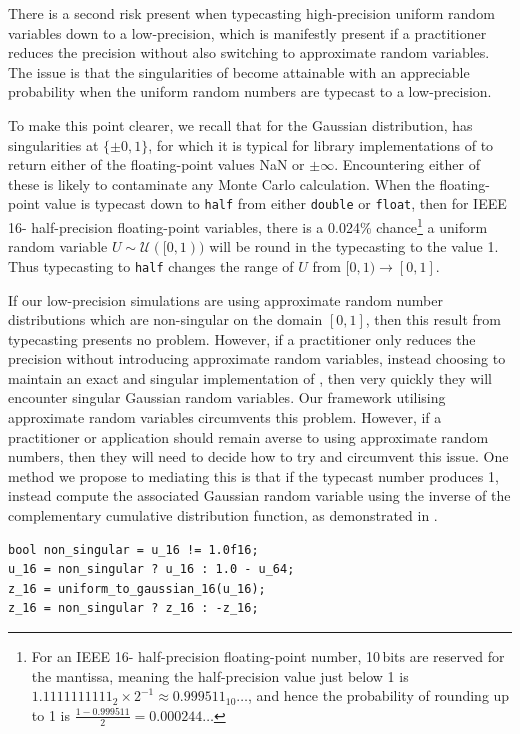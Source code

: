\documentclass[11pt,a4paper,twoside,english]{extarticle}
\begin{document}
There is a second risk present when typecasting high-precision uniform random variables down to a low-precision, which is manifestly present if a practitioner reduces the precision without also switching to approximate random variables. The issue is that the singularities of \PhiInverse become attainable with an appreciable probability when the uniform random numbers are typecast to a low-precision. 

To make this point clearer, we recall that for the Gaussian distribution, \PhiInverse has singularities at $ \{\pm 0, 1\} $, for which it is typical for library implementations of \PhiInverse to return either of the floating-point values NaN or $ \pm\infty $. Encountering either of these is likely to contaminate any Monte Carlo calculation. When the floating-point value is typecast down to \verb|half| from either \verb|double| or \verb|float|, then for IEEE 16-\si{\bit} half-precision floating-point variables, there is a 0.024\% chance\footnote{For an IEEE 16-\si{\bit} half-precision floating-point number, 10\,bits are reserved for the mantissa, meaning the half-precision value just below 1 is $ 1.1111111111_2\times2^{-1} \approx 0.999511_{10}\ldots $, and hence the probability of rounding up to 1 is  $ \tfrac{1 - 0.999511}{2} = 0.000244\ldots$} a uniform random variable $ U \sim \mathcal{U}([0,1)) $ will be round in the typecasting to the value 1. Thus typecasting to \verb|half| changes the range of $ U $ from $ [0, 1) \to [0, 1] $.

If our low-precision simulations are using approximate random number distributions which are non-singular on the domain $ [0, 1] $, then this result from typecasting presents no problem. However, if a practitioner only reduces the precision without introducing approximate random variables, instead choosing to maintain an exact and singular implementation of \PhiInverse, then very quickly they will encounter singular Gaussian random variables. Our framework utilising approximate random variables circumvents this problem. However, if a practitioner or application should remain averse to using approximate random numbers, then they will need to decide how to try and circumvent this issue. One method we propose to mediating this is that if the typecast number produces 1, instead compute the associated Gaussian random variable using the inverse of the complementary cumulative distribution function, as demonstrated in .


\begin{lstfloat}[htb]
\begin{lstlisting}[style=C, captionpos=b, caption={[Compute Gaussian random variable using the inverse complementary CDF]Computing a low-precision Gaussian random variable using the inverse complementary CDF.}, label={code:c:gaussian_random_variables_using_inverse_complementary_cdf}]
bool non_singular = u_16 != 1.0f16;
u_16 = non_singular ? u_16 : 1.0 - u_64;
z_16 = uniform_to_gaussian_16(u_16);
z_16 = non_singular ? z_16 : -z_16; 
\end{lstlisting}
\end{lstfloat}
\end{document}
